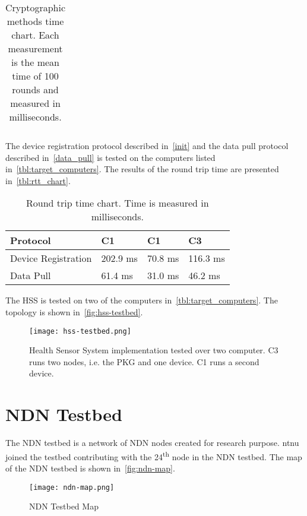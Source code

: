 \begin{table}[h]
\begin{tabular}[c]{lllll}
  \end{tabular}
  \caption[Time chart of cryptographic computations]{Cryptographic methods time chart. Each measurement is the mean time of 100 rounds and measured in milliseconds. }
  \label{tbl:time_chart}
\end{table}


The device registration protocol described in~\autoref{init} and the data pull protocol described in~\autoref{data_pull} is tested on the computers listed in~\autoref{tbl:target_computers}.
The results of the round trip time are presented in~\autoref{tbl:rtt_chart}.
\begin{table}[h]
  \begin{tabular}[c]{p{}p{}p{}p{}}
  Protocol                                & C1            & C1            & C3            \\ \hline
  Device Registration                     & 202.9 ms      & 70.8 ms       & 116.3 ms      \\ %
  Data Pull                               & 61.4 ms       & 31.0 ms       & 46.2 ms       \\ %
  \end{tabular}
  \caption[Round trip time of protocols]{Round trip time chart. Time is measured in milliseconds.}
  \label{tbl:rtt_chart}
\end{table}

The \gls{HSS} is tested on two of the computers in~\autoref{tbl:target_computers}.
The topology is shown in~\autoref{fig:hss-testbed}.
\begin{figure}[ht]
  \centering
  \texttt{[image: hss-testbed.png]}
  \caption[HSS testing - computer topology]{Health Sensor System implementation tested over two computer. 
  C3 runs two nodes, i.e. the PKG and one device. 
  C1 runs a second device.}
  \label{fig:hss-testbed}
\end{figure}

\section{NDN Testbed}
The \gls{NDN} testbed is a network of \gls{NDN} nodes created for research purpose. 
\gls{ntnu} joined the testbed contributing with the 24\textsuperscript{th} node in the NDN testbed.
The map of the NDN testbed is shown in~\autoref{fig:ndn-map}.

\begin{figure}[ht]
  \centering
  \texttt{[image: ndn-map.png]}
  \caption[NDN Testbed map]{NDN Testbed Map}
  \label{fig:ndn-map}
\end{figure}
